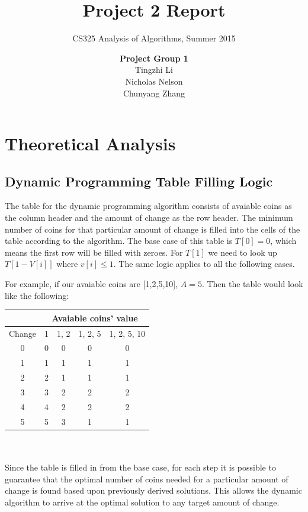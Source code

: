 \documentclass[11pt]{scrreprt}
\title{\textbf{Project 2 Report}}
\subtitle{CS325 Analysis of Algorithms, Summer 2015}
\author{\textsf{\textbf{Project Group 1}}\\
		\textsf{Tingzhi Li}\\
		\textsf{Nicholas Nelson}\\
		\textsf{Chunyang Zhang}}
\date{}
\begin{document}
\maketitle


\chapter{Theoretical Analysis}

\section{Dynamic Programming Table Filling Logic}

The table for the dynamic programming algorithm consists of avaiable coins as the column header and the amount of change as the row header. The minimum number of coins for that particular amount of change is filled into the cells of the table according to the algorithm. The base case of this table is $T[0]=0$, which means the first row will be filled with zeroes. For $T[1]$ we need to look up $T[1-V[i]]$ where $v[i]\leq 1$. The same logic applies to all the following cases.

For example, if our avaiable coins are [1,2,5,10], $A=5$. Then the table would look like the following:\\

\begin{tabular}{|c|c|c|c|c|}
	\hline & \multicolumn{4}{|c|}{Avaiable coins' value} \\
	\hline Change & 1  & 1, 2 & 1, 2, 5 & 1, 2, 5, 10 \\ 
	\hline 0 & 0 & 0 & 0 & 0 \\ 
	\hline 1 & 1 & 1 & 1 & 1 \\ 
	\hline 2 & 2 & 1 & 1 & 1 \\ 
	\hline 3 & 3 & 2 & 2 & 2 \\ 
	\hline 4 & 4 & 2 & 2 & 2 \\ 
	\hline 5 & 5 & 3 & 1 & 1 \\ 
	\hline 
\end{tabular}\\\\

Since the table is filled in from the base case, for each step it is possible to guarantee that the optimal number of coins needed for a particular amount of change is found based upon previously derived solutions. This allows the dynamic algorithm to arrive at the optimal solution to any target amount of change.
\end{document}
